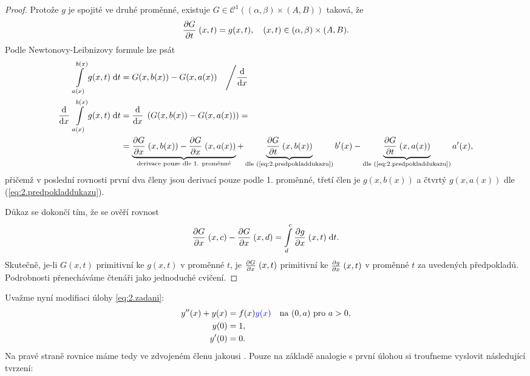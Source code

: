 \begin{proof}
Protože $g$ je spojité ve druhé proměnné, existuje $G\in \mathcal{C}^1((\alpha,\beta)\times(A,B))$ taková, že 
\begin{equation}
    \frac{\partial G}{\partial t} \;(x,t)=g(x,t),\quad (x,t)\in (\alpha,\beta)\times(A,B).
    \label{eq:2.predpokladdukazu}
\end{equation}
Podle Newtonovy-Leibnizovy formule lze psát
\begin{equation}
    \begin{split}
        \int\limits_{a(x)}^{b(x)}g(x,t)\;\mathrm{d}t &= G(x,b(x))-G(x,a(x)) \quad \Bigg/ \frac{\mathrm{d} }{\mathrm{d} x} \;\\
        \frac{\mathrm{d} }{\mathrm{d} x} \;\int\limits_{a(x)}^{b(x)}g(x,t)\;\mathrm{d}t &= \frac{\mathrm{d} }{\mathrm{d} x} \; \left(G(x,b(x))-G(x,a(x))\right) 
        = \\ &=
        \underbrace{\frac{\partial G}{\partial x} \;(x,b(x))-\frac{\partial G}{\partial x} \;(x,a(x))}_{\text{derivace pouze dle 1. proměnné}}+\underbrace{\frac{\partial G}{\partial t} \;(x,b(x))}_{\text{dle (\ref{eq:2.predpokladdukazu})}}b'(x)-\underbrace{\frac{\partial G}{\partial t} \;(x,a(x))}_{\text{dle (\ref{eq:2.predpokladdukazu})}}a'(x),
    \end{split}
\end{equation}
přičemž v poslední rovnosti první dva členy jsou derivací pouze podle 1. proměnné, třetí člen je $g(x,b(x))$ a čtvrtý $g(x,a(x))$ dle (\ref{eq:2.predpokladdukazu}).

Důkaz se dokončí tím, že se ověří rovnost
\begin{equation}
    \frac{\partial G}{\partial x} \;(x,c)-\frac{\partial G}{\partial x} \;(x,d)=\int\limits_{d}^c \frac{\partial g}{\partial x} \;(x,t)\;\mathrm{d}t.
\end{equation}
Skutečně, je-li $G(x,t)$ primitivní ke $g(x,t)$ v proměnné $t$, je $\frac{\partial G}{\partial x} \;(x,t)$ primitivní ke $\frac{\partial g}{\partial x} \;(x,t)$ v proměnné $t$ za uvedených předpokladů. Podrobnosti přenecháváme čtenáři jako jednoduché cvičení.
\end{proof}

Uvažme nyní modifiaci úlohy \eqref{eq:2.zadani}:
\begin{equation}
    \begin{split}
        y''(x)+y(x)&=f(x)\textcolor{blue}{y(x)} \quad \text{na } (0,a) \text{ pro } a>0,\\
        y(0)&=1,\\
        y'(0)&=0.
    \end{split}
    \label{eq:2.zadani_y(x)_vpravo}
\end{equation}
Na pravé straně rovnice máme tedy ve zdvojeném členu jakousi . Pouze na základě analogie s první úlohou si troufneme vyslovit následující tvrzení:

